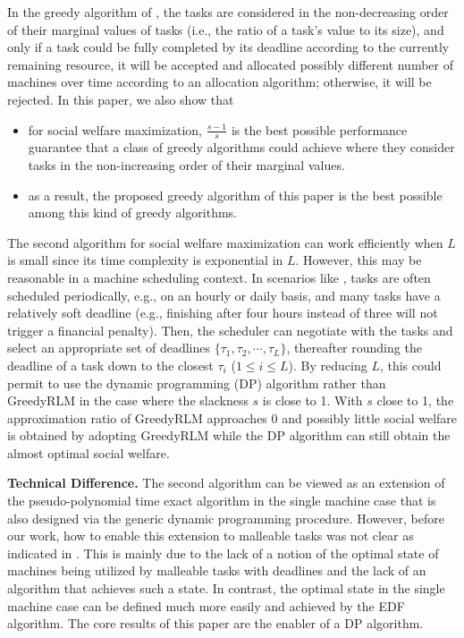 \documentclass[10pt,journal,compsoc]{IEEEtran}
\begin{document}
In the greedy algorithm of \cite{Jain}, the tasks are considered in the non-decreasing order of their marginal values of tasks (i.e., the ratio of a task's value to its size), and only if a task could be fully completed by its deadline according to the currently remaining resource, it will be accepted and allocated possibly different number of machines over time according to an allocation algorithm; otherwise, it will be rejected. In this paper, we also show that
\begin{itemize}
\item for social welfare maximization, $\frac{s-1}{s}$ is the best possible performance guarantee that a class of greedy algorithms could achieve where they consider tasks in the non-increasing order of their marginal values.
\item as a result, the proposed greedy algorithm of this paper is the best possible among this kind of greedy algorithms.
\end{itemize}






The second algorithm for social welfare maximization can work efficiently when $L$ is small since its time complexity is exponential in $L$. However, this may be reasonable in a machine scheduling context. In scenarios like \cite{Bodik}, tasks are often scheduled periodically, e.g., on an hourly or daily basis, and many tasks have a relatively soft deadline (e.g., finishing after four hours instead of three will not trigger a financial penalty). Then, the scheduler can negotiate with the tasks and select an appropriate set of deadlines $\{\tau_{1}, \tau_{2}, \cdots, \tau_{L}\}$, thereafter rounding the deadline of a task down to the closest $\tau_{i}$ ($1\leq i\leq L$). By reducing $L$, this could permit to use the dynamic programming (DP) algorithm rather than GreedyRLM in the case where the slackness $s$ is close to 1. With $s$ close to 1, the approximation ratio of GreedyRLM approaches 0 and possibly little social welfare is obtained by adopting GreedyRLM while the DP algorithm can still obtain the almost optimal social welfare.



\vspace{0.22em}\noindent\textbf{Technical Difference.} The second algorithm can be viewed as an extension of the pseudo-polynomial time exact algorithm in the single machine case \cite{Lawler91} that is also designed via the generic dynamic programming procedure. However, before our work, how to enable this extension to malleable tasks was not clear as indicated in \cite{Jain11a,Jain}. This is mainly due to the lack of a notion of the optimal state of machines being utilized by malleable tasks with deadlines and the lack of an algorithm that achieves such a state. In contrast, the optimal state in the single machine case can be defined much more easily and achieved by the EDF algorithm. The core results of this paper are the enabler of a DP algorithm.
\end{document}

